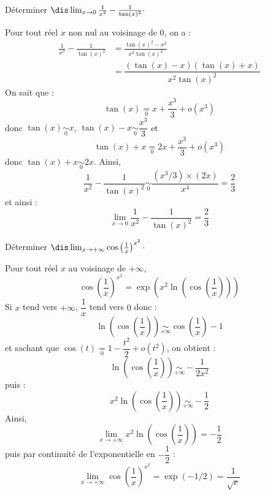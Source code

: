 \documentclass[a4paper,10pt]{report}
\begin{document}
\medskip



\begin{Exa} Déterminer $\dis \lim_{x \rightarrow 0} \frac{1}{x^2} - \frac{1}{\tan(x)^2} \cdot$
\end{Exa} 

\corr Pour tout réel $x$ non nul au voisinage de $0$, on a :
\begin{align*}
\frac{1}{x^2} - \frac{1}{\tan(x)^2} & = \frac{\tan(x)^2-x^2}{x^2 \tan(x)^2} \\
& = \dfrac{(\tan(x)-x)(\tan(x)+x)}{x^2 \tan(x)^2} 
\end{align*}
On sait que :
$$ \tan(x) \underset{0}{=} x + \dfrac{x^3}{3} + o(x^3)$$
donc $\tan(x) \underset{0}{\sim} x$, $\tan(x)-x \underset{0}{\sim} \dfrac{x^3}{3}$ et 
$$ \tan(x)+x \underset{0}{=} 2x + \dfrac{x^3}{3} + o(x^3)$$
donc $\tan(x)+x \underset{0}{\sim} 2x$. Ainsi,
$$ \frac{1}{x^2} - \frac{1}{\tan(x)^2} \underset{0}{\sim} \dfrac{(x^3/3) \times(2x)}{x^4} = \dfrac{2}{3}$$
et ainsi :
$$ \lim_{x \rightarrow 0} \frac{1}{x^2} - \frac{1}{\tan(x)^2} = \dfrac{2}{3}$$

\medskip



\begin{Exa} Déterminer $\dis \lim_{x \rightarrow + \infty}  \cos \left( \frac{1}{x} \right)^{x^2} \cdot$
\end{Exa}

\corr Pour tout réel $x$ au voisinage de $+ \infty$,
$$ \cos \left( \frac{1}{x} \right)^{x^2} = \exp \left(x^2 \ln \left( \cos \left( \dfrac{1}{x} \right) \right) \right)$$
Si $x$ tend vers $+ \infty$, $\dfrac{1}{x}$ tend vers $0$ donc :
$$ \ln \left( \cos \left( \dfrac{1}{x} \right) \right) \underset{+ \infty}{\sim} \cos \left( \dfrac{1}{x} \right) - 1 $$
et sachant que $\cos(t) \underset{0}{=} 1 - \dfrac{t^2}{2}+ o(t^2)$, on obtient :
$$  \ln \left( \cos \left( \dfrac{1}{x} \right) \right) \underset{+ \infty}{\sim} - \dfrac{1}{2x^2}$$
puis :
$$ x^2 \ln \left( \cos \left( \dfrac{1}{x} \right) \right) \underset{+ \infty}{\sim} - \dfrac{1}{2}$$
Ainsi,
$$ \lim_{x \rightarrow + \infty} x^2 \ln \left( \cos \left( \dfrac{1}{x} \right) \right) = -\dfrac{1}{2}$$
puis par continuité de l'exponentielle en $-\dfrac{1}{2}$ :
$$ \lim_{x \rightarrow + \infty}  \cos \left( \frac{1}{x} \right)^{x^2} = \exp(-1/2) = \dfrac{1}{\sqrt{e}}$$

\medskip
\end{document}
